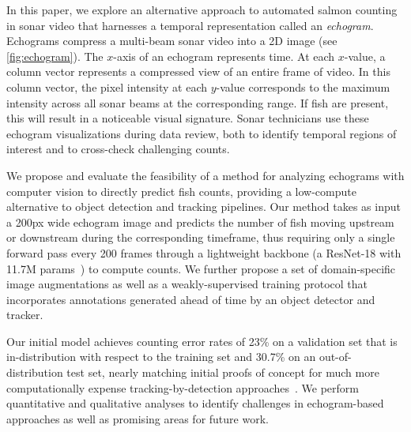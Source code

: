 
In this paper, we explore an alternative approach to automated salmon counting in sonar video that harnesses a temporal representation called an \textit{echogram}. Echograms compress a multi-beam sonar video into a 2D image (see \cref{fig:echogram}). The $x$-axis of an echogram represents time. At each $x$-value, a column vector represents a compressed view of an entire frame of video. In this column vector, %
the pixel intensity at each $y$-value corresponds to the maximum intensity across all sonar beams at the corresponding range. If fish are present, this will result in a noticeable visual signature. Sonar technicians use these echogram visualizations during data review, %
both to identify temporal regions of interest %
and to cross-check challenging counts. %

We propose and evaluate the feasibility of a method for analyzing echograms with computer vision to directly predict fish counts, providing a low-compute alternative to object detection and tracking pipelines. Our method takes as input a 200px wide echogram image and predicts the number of fish moving upstream or downstream during the corresponding timeframe, thus requiring only a single forward pass every 200 frames through a lightweight backbone (\eg a ResNet-18 with 11.7M params~\cite{he2016deep}) to compute counts. We further propose a set of domain-specific image augmentations as well as a weakly-supervised training protocol that incorporates annotations generated ahead of time by an object detector and tracker. 

Our initial model achieves counting error rates of 23\% on a validation set that is in-distribution with respect to the training set and 30.7\% on an out-of-distribution test set, nearly matching initial proofs of concept for much more computationally expense tracking-by-detection approaches~\cite{kulits2020automated}. We perform quantitative and qualitative analyses to identify challenges in echogram-based approaches as well as promising areas for future work.